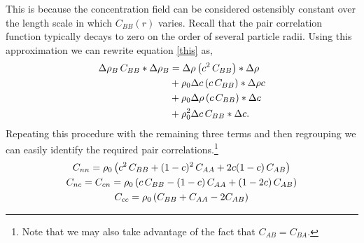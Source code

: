%
This is because the concentration field can be considered ostensibly constant
over the length scale in which $C_{BB}(r)$ varies. Recall that the pair
correlation function typically decays to zero on the order of several particle
radii. Using this approximation we can rewrite equation \ref{this} as,
%
\begin{align}
  \Delta \rho_B \, C_{BB} \ast \Delta \rho_B &= \Delta \rho \left(c^2 \,C_{BB}\right) \ast \Delta \rho \nonumber\\
                             &+ \rho_0 \Delta c \left(c \,C_{BB}\right) \ast \Delta \rho c \\
                             &+ \rho_0 \Delta \rho \left(c \,C_{BB}\right) \ast \Delta c \nonumber\\
                             &+ \rho_0^2 \Delta c \,C_{BB} \ast \Delta c. \nonumber
\end{align}
%
Repeating this procedure with the remaining three terms and then regrouping we
can easily identify the required pair correlations.\footnote{Note that we may
also take advantage of the fact that $C_{AB} = C_{BA}$.}
%
\begin{gather}
  C_{nn} = \rho_0 \left( c^2 \, C_{BB} + (1 - c)^2 \, C_{AA} + 2c(1-c)\,C_{AB}\right) \\
  C_{nc} = C_{cn} = \rho_0 \left( c\,C_{BB} - (1-c)\,C_{AA} + (1 - 2c) \, C_{AB} \right) \\
  C_{cc} = \rho_0 \left( C_{BB} + C_{AA} - 2 C_{AB} \right)
\end{gather}

